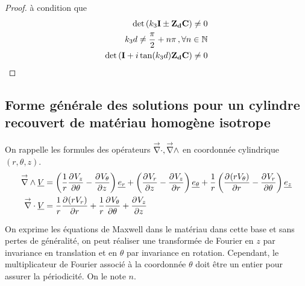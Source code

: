 \begin{proof}
    à condition que 
    \begin{align}
        \det\left(k_3\mI \pm \mat{Z_d}\mC \right) \not = 0 \\
        k_3d\not = \frac{\pi}{2}+n\pi\,, \forall n \in \NN \\
        \det\left(\mI + i\tan(k_3d)\mat{Z_d}\mC\right) \not = 0
    \end{align}




\end{proof}







\subsection{Forme générale des solutions pour un cylindre recouvert de matériau homogène isotrope}

On rappelle les formules des opérateurs $\vdiv, \vrot$ en coordonnée cylindrique $(r,\theta,z)$.
\begin{align}
    \vrot \v{V} &= \left(\frac{1}{r}\ddr{\theta}{V_z} - \ddr{z}{V_\theta}\right)\v{e_r} + 
    \left(\ddr{z}{V_r} - \ddr{r}{V_z}\right)\v{e_\theta} +
    \frac{1}{r}\left(\ddr{r}{(rV_\theta)}-\ddr{\theta}{V_r}\right)\v{e_z} 
    \\
    \vdiv \v{V} &= \frac{1}{r}\ddr{r}{(rV_r)}+\frac{1}{r}\ddr{\theta}{V_\theta}+\ddr{z}{V_z}
\end{align}

\newcommand{\mr}{r}
\newcommand{\mt}{\theta}
\newcommand{\mz}{z}

\begin{figure}[!hbt]
    \centering
    \begin{tikzpicture}
        
    \end{tikzpicture}
\end{figure}

On exprime les équations de Maxwell dans le matériau dans cette base et sans pertes de généralité, on peut réaliser une transformée de Fourier en $z$ par invariance en translation et en $\theta$ par invariance en rotation. Cependant, le multiplicateur de Fourier associé à la coordonnée $\theta$ doit être un entier pour assurer la périodicité. On le note $n$.

